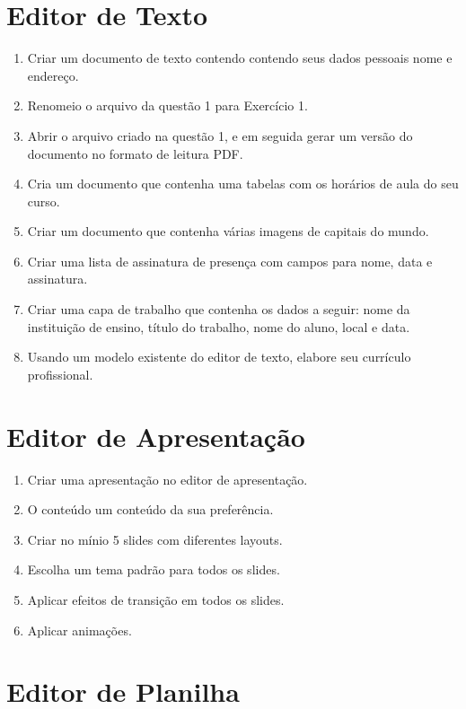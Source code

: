 \documentclass[11pt]{article}
\begin{document}
	\newpage
	\section{Editor de Texto}
	
	\begin{enumerate}
		\item Criar um documento de texto contendo contendo seus dados pessoais nome e endere\c co.
		\item Renomeio o arquivo da questão 1 para Exercício 1.
		\item Abrir o arquivo criado na questão 1, e em seguida gerar um versão do documento no formato de leitura PDF.
		\item Cria um documento que contenha uma tabelas com os horários de aula do seu curso.
		\item Criar um documento que contenha várias imagens de capitais do mundo.
		\item Criar uma lista de assinatura de presença com campos para nome, data e assinatura.
		\item Criar uma capa de trabalho que contenha os dados a seguir: nome da instituição de ensino, título do trabalho, nome do aluno, local e data.
		\item Usando um modelo existente do editor de texto, elabore seu currículo profissional.
	\end{enumerate}

	\newpage
	\section{Editor de Apresenta\c cão}

	\begin{enumerate}
		\item Criar uma apresentação no editor de apresenta\c cão.
		\item O conteúdo um conteúdo da sua preferência.
		\item Criar no mínio 5 slides com diferentes layouts.
		\item Escolha um tema padrão para todos os slides.
		\item Aplicar efeitos de transição em todos os slides.
		\item Aplicar animações.
	\end{enumerate}

	\newpage
	\section{Editor de Planilha}
\end{document}
